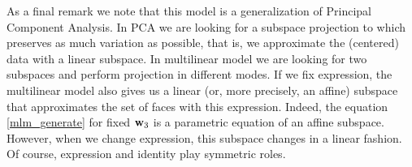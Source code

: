 As a final remark we note that this model is a generalization of Principal Component 
Analysis. In PCA we are looking for a subspace projection to which
preserves as much variation as possible, that is, we approximate
the (centered) data with a linear subspace.
In multilinear model we are looking for two subspaces and perform projection
in different modes. If we fix expression, the multilinear model
also gives us a linear (or, more precisely, an affine) subspace that approximates 
the set of faces with  this expression. Indeed,
the equation \eqref{mlm_generate} for fixed ${\mathbf{w}}_3$ is a parametric
equation of an affine subspace. However, when we change
expression, this subspace changes in a linear fashion. Of course,
expression and identity play symmetric roles.